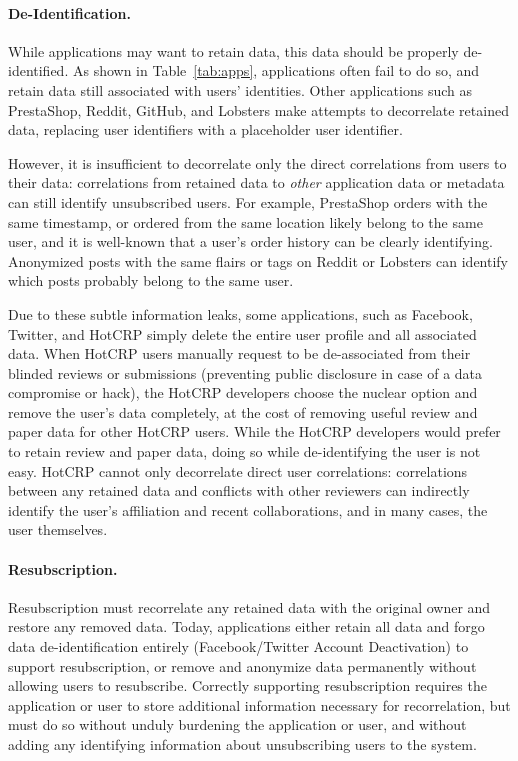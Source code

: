 \paragraph{De-Identification.}
While applications may want to retain data, this data should be properly de-identified. As shown in
Table~\ref{tab:apps}, applications often fail to do so, and retain data still associated
with users' identities. Other applications such as PrestaShop, Reddit, GitHub, and Lobsters make
attempts to decorrelate retained data, replacing user identifiers with a placeholder user identifier. 

However, it is insufficient to decorrelate only the direct correlations from users to their data:
correlations from retained data to \emph{other} application data or metadata can still identify
unsubscribed users. For example, PrestaShop orders with the same timestamp, or ordered from the same
location likely belong to the same user, and it is well-known that a user's order history can be
clearly identifying. Anonymized posts with the same flairs or tags on Reddit or Lobsters can
identify which posts probably belong to the same user. 

Due to these subtle information leaks, some applications, such as Facebook, Twitter, and HotCRP
simply delete the entire user profile and all associated data. When HotCRP users manually request to
be de-associated from their blinded reviews or submissions (preventing public disclosure in case of
a data compromise or hack), the HotCRP developers choose the nuclear option and remove the user's
data completely, at the cost of removing useful review and paper data for other HotCRP users.  While
the HotCRP developers would prefer to retain review and paper data, doing so while de-identifying
the user is not easy. HotCRP cannot only decorrelate direct user correlations: 
correlations between any retained data and conflicts with other reviewers can indirectly identify the user's
affiliation and recent collaborations, and in many cases, the user themselves.

\paragraph{Resubscription.}
Resubscription must recorrelate any retained data with the original owner and restore any removed
data. Today, applications either retain all data and forgo data de-identification entirely
(Facebook/Twitter Account Deactivation) to support resubscription, or remove and anonymize data
permanently without allowing users to resubscribe. Correctly supporting resubscription requires the
application or user to store additional information necessary for recorrelation, but must do so
without unduly burdening the application or user, and without adding any identifying information
about unsubscribing users to the system.

